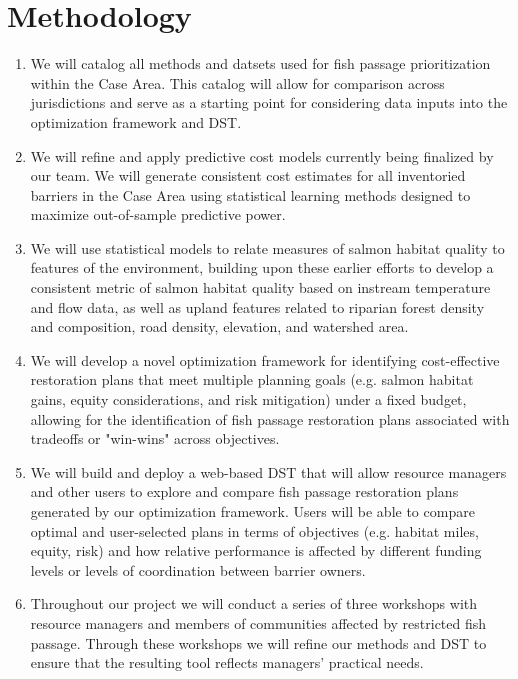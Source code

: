 \documentclass[12pt]{elsarticle}
\begin{document}
		\section{Methodology} 
			\begin{enumerate}
				\item We will catalog all methods and datsets used for fish passage prioritization within the Case Area. This catalog will allow for comparison across jurisdictions and serve as a starting point for considering data inputs into the optimization framework and DST.
				\item We will refine and apply predictive cost models currently being finalized by our team. We will generate consistent cost estimates for all inventoried barriers in the Case Area using statistical learning methods designed to maximize out-of-sample predictive power.
				\item We will use statistical models to relate measures of salmon habitat quality to features of the environment, building upon these earlier efforts to develop a consistent metric of salmon habitat quality based on instream temperature and flow data, as well as upland features related to riparian forest density and composition, road density, elevation, and watershed area.
				\item We will develop a novel optimization framework for identifying cost-effective restoration plans that meet multiple planning
				goals (e.g. salmon habitat gains, equity considerations, and risk mitigation) under a fixed budget, allowing for the identification of fish passage restoration plans associated with tradeoffs or "win-wins" across objectives.
				\item We will build and deploy a web-based DST that will allow resource managers and other users to explore and compare fish passage restoration plans generated by our optimization framework. Users will be able to compare optimal and user-selected plans in terms of objectives (e.g. habitat miles, equity, risk) and how relative performance is affected by different funding levels or levels of coordination between barrier owners.
				\item Throughout our project we will conduct a series of three workshops with resource managers and members of communities affected by restricted fish passage. Through these workshops we will refine our methods and DST to ensure that the resulting tool reflects managers' practical needs.
			\end{enumerate}
\end{document}
